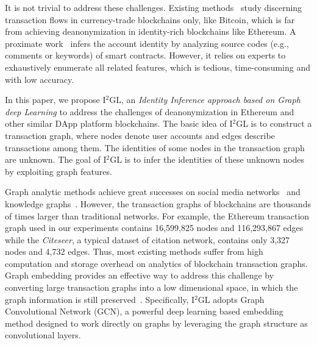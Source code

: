 It is not trivial to address these challenges. Existing methods~\cite{maesa2016analysis,ranshous2017exchange,zhao2015graph} study discerning transaction flows in currency-trade blockchains only, like Bitcoin, which is far from achieving deanonymization in identity-rich blockchains like Ethereum. A proximate work~\cite{chen2018infocom} infers the account identity by analyzing source codes (e.g., comments or keywords) of smart contracts. However, it relies on experts to exhaustively enumerate all related features, which is tedious, time-consuming and with low accuracy.


In this paper, we propose I$^2$GL, an \textit{Identity Inference approach based on Graph deep Learning} to address the challenges of deanonymization in Ethereum and other similar DApp platform blockchains. The basic idea of I$^2$GL is to construct a transaction graph, where nodes denote user accounts and edges describe transactions among them. The identities of some nodes in the transaction graph are unknown. The goal of I$^2$GL is to infer the identities of these unknown nodes by exploiting graph features.

Graph analytic methods achieve great successes on social media networks~\cite{geng2015learning} and knowledge graphs~\cite{bollacker2008freebase}. However, the transaction graphs of blockchains are thousands of times larger than traditional networks. For example, the Ethereum transaction graph used in our experiments contains 16,599,825 nodes and 116,293,867 edges while the \emph{Citeseer}, a typical dataset of citation network, contains only 3,327 nodes and 4,732 edges. Thus, most existing methods suffer from high computation and storage overhead on analytics of blockchain transaction graphs. Graph embedding provides an effective way to address this challenge by converting large transaction graphs into a low dimensional space, in which the graph information is still preserved~\cite{hamilton2017representation}.
Specifically, I$^2$GL adopts Graph Convolutional Network (GCN), a powerful deep learning based embedding method designed to work directly on graphs by leveraging the graph structure as convolutional layers.

